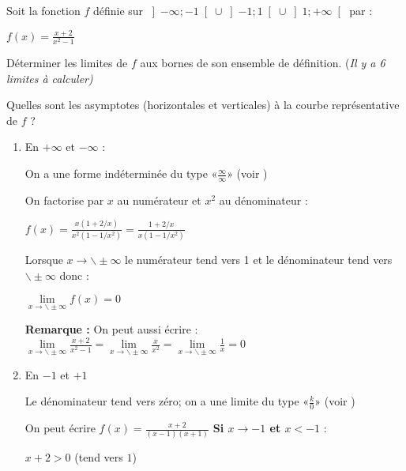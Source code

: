 
%
Soit la fonction $f$ définie sur $\left]-\infty  ; -1\right[ \cup  \left]-1 ; 1\right[ \cup  \left]1 ; +\infty \right[ $ par :
\par
$f\left(x\right)=\frac{x+2}{x^{2}-1}$
\par
Déterminer les limites de $f$ aux bornes de son ensemble de définition. (\textit{Il y a 6 limites à calculer)}
\par
Quelles sont les asymptotes (horizontales et verticales) à la courbe représentative de $f$ ?
\begin{corrige}
     \begin{enumerate}
          \item
          En $+\infty $ et $-\infty $ :
          \par
          On a une forme indéterminée du type «$\frac{\infty}{\infty} $» (voir )
          \par
          On factorise par $x$ au numérateur et $x^{2}$ au dénominateur :
          \par
          $f\left(x\right)=\frac{x\left(1+2/x\right)}{x^{2}\left(1-1/x^{2}\right)}=\frac{1+2/x}{x\left(1-1/x^{2}\right)}  $
          \par
          Lorsque $x\rightarrow \backslash\pm \infty $ le numérateur tend vers 1 et le dénominateur tend vers $\backslash\pm \infty $ donc :
          \par
          $\lim\limits_{x\rightarrow \backslash\pm \infty }f\left(x\right)=0$
\par
          \textbf{Remarque :} On peut aussi écrire : $\lim\limits_{x\rightarrow \backslash\pm \infty }\frac{x+2}{x^{2}-1}=\lim\limits_{x\rightarrow \backslash\pm \infty }\frac{x}{x^{2}}=\lim\limits_{x\rightarrow \backslash\pm \infty }\frac{1}{x}=0$
          \item
          En $-1$ et $+1$
          \par
          Le dénominateur tend vers zéro; on a une limite du type «$\frac{k}{0}$» (voir )
          \par
          On peut écrire $f\left(x\right)=\frac{x+2}{\left(x-1\right)\left(x+1\right)}$
\medskip
          \textbf{Si $x\rightarrow -1$ et $x < -1$} :
          \par
          $x+2 > 0$ (tend vers $1$)

\end{enumerate}
\end{corrige}
